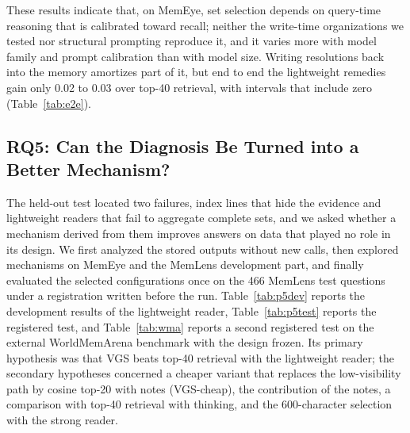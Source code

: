 These results indicate that, on MemEye, set selection depends on query-time reasoning that is calibrated toward recall; neither the write-time organizations we tested nor structural prompting reproduce it, and it varies more with model family and prompt calibration than with model size. Writing resolutions back into the memory amortizes part of it, but end to end the lightweight remedies gain only 0.02 to 0.03 over top-40 retrieval, with intervals that include zero (Table~\ref{tab:e2e}).

\subsection{RQ5: Can the Diagnosis Be Turned into a Better Mechanism?}
\label{sec:rq5}

The held-out test located two failures, index lines that hide the evidence and lightweight readers that fail to aggregate complete sets, and we asked whether a mechanism derived from them improves answers on data that played no role in its design. We first analyzed the stored outputs without new calls, then explored mechanisms on MemEye and the MemLens development part, and finally evaluated the selected configurations once on the 466 MemLens test questions under a registration written before the run. Table~\ref{tab:p5dev} reports the development results of the lightweight reader, Table~\ref{tab:p5test} reports the registered test, and Table~\ref{tab:wma} reports a second registered test on the external WorldMemArena benchmark with the design frozen. Its primary hypothesis was that VGS beats top-40 retrieval with the lightweight reader; the secondary hypotheses concerned a cheaper variant that replaces the low-visibility path by cosine top-20 with notes (VGS-cheap), the contribution of the notes, a comparison with top-40 retrieval with thinking, and the 600-character selection with the strong reader.

